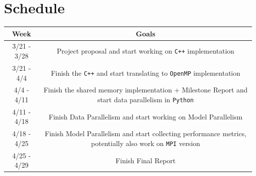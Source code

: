 \documentclass{article}
\begin{document}
\section*{Schedule}

\begin{center}
	\begin{tabular}{ |c|c| }
		\hline
		Week & Goals \\
		\hline
		3/21 - 3/28 & Project proposal and start working on \texttt{C++} implementation \\
		\hline
		3/21 - 4/4 & Finish the \texttt{C++} and start translating to \texttt{OpenMP} implementation\\
		\hline
		4/4 - 4/11 & Finish the shared memory implementation + Milestone Report and start data parallelism in \texttt{Python} \\
		\hline
		4/11 - 4/18 & Finish Data Parallelism and start working on Model Parallelism\\
		\hline
		4/18 - 4/25 & Finish Model Parallelism and start collecting performance metrics, potentially also work on \texttt{MPI} version\\
		\hline
		4/25 - 4/29 & Finish Final Report\\
		\hline
	\end{tabular}\\
\end{center}
\end{document}
